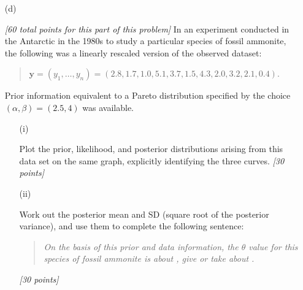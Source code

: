 \documentclass[12pt]{article}
\begin{document}
\begin{itemize}
\begin{itemize}
\item[(d)]

\textit{[60 total points for this part of this problem]} In an experiment conducted in the Antarctic in the 1980s to study a
particular species of fossil ammonite, the following was a linearly rescaled
version of the observed dataset: 

\begin{quote}

$\bm{ y } = ( y_1, \ldots, y_n ) = ( 2.8, 1.7, 1.0, 5.1, 3.7, 1.5, 4.3, 2.0, 3.2, 2.1, 0.4 )$. 

\end{quote}

Prior information equivalent to a Pareto distribution specified by the choice $( \alpha, \beta ) = ( 2.5, 4 )$ was available. 

\begin{itemize}

\item[(i)]

Plot the prior, likelihood, and posterior distributions arising from this data set on the same graph, explicitly identifying the three curves. \textit{[30 points]}

\item[(ii)]

Work out the posterior mean and SD (square root of the posterior variance), and use them to complete the following sentence:

\begin{quote}

\textit{On the basis of this prior and data information, the $\theta$ value for this species of fossil ammonite is about \underline{\hspace*{0.5in}}, give or take about \underline{\hspace*{0.5in}}.}

\end{quote}
\textit{[30 points]}

\end{itemize}

\end{itemize}

\end{itemize}
\end{document}
